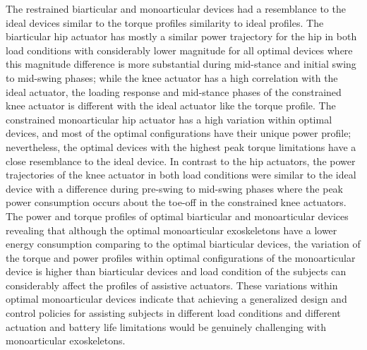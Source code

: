 \documentclass[10pt,letterpaper]{article}
\begin{document}
The restrained biarticular and monoarticular devices had a resemblance to the ideal devices similar to the torque profiles similarity to ideal profiles. The biarticular hip actuator has mostly a similar power trajectory for the hip in both load conditions with considerably lower magnitude for all optimal devices where this magnitude difference is more substantial during mid-stance and initial swing to mid-swing phases; while the knee actuator has a high correlation with the ideal actuator, the loading response and mid-stance phases of the constrained knee actuator is different with the ideal actuator like the torque profile. The constrained monoarticular hip actuator has a high variation within optimal devices, and most of the optimal configurations have their unique power profile; nevertheless, the optimal devices with the highest peak torque limitations have a close resemblance to the ideal device. In contrast to the hip actuators, the power trajectories of the knee actuator in both load conditions were similar to the ideal device with a difference during pre-swing to mid-swing phases where the peak power consumption occurs about the toe-off in the constrained knee actuators.\\
The power and torque profiles of optimal biarticular and monoarticular devices revealing that although the optimal monoarticular exoskeletons have a lower energy consumption comparing to the optimal biarticular devices, the variation of the torque and power profiles within optimal configurations of the monoarticular device is higher than biarticular devices and load condition of the subjects can considerably affect the profiles of assistive actuators. These variations within optimal monoarticular devices indicate that achieving a generalized design and control policies for assisting subjects in different load conditions and different actuation and battery life limitations would be genuinely challenging with monoarticular exoskeletons.\\
\end{document}
